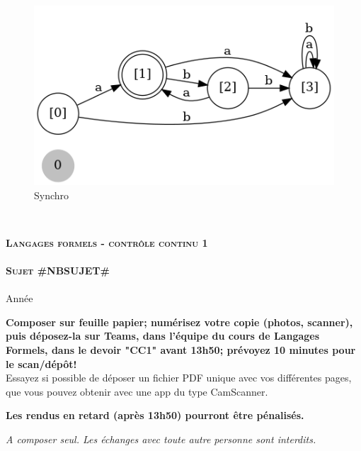 \documentclass[]{article}
\begin{document}
\begin{enumerate}
\begin{figure}[htbp]
            \includegraphics[width=15cm]{automateSynchro.png}
            \caption{Synchro}\label{fig:3.1}
        \end{figure}\\
    \end{enumerate}
    \setcounter{section}{0}
    \newpage
    \begin{center}
    {\Large \textbf{\textsc{Langages formels - contrôle continu 1}}}
        \\
        ~\\
        {\Huge \textbf{\textsc{Sujet #NBSUJET#}}}\\
        ~\\
        Année \the\year
    \end{center}

    \vskip 5mm
    \textbf{Composer sur feuille papier; numérisez votre copie (photos, scanner), puis déposez-la sur Teams, dans l'équipe du cours de Langages Formels, dans le devoir "CC1" avant 13h50; prévoyez 10 minutes pour le scan/dépôt!} \\

    Essayez si possible de déposer un fichier PDF unique avec vos différentes pages, que vous pouvez obtenir avec une app du type CamScanner.


    \textbf{Les rendus en retard (après 13h50) pourront être pénalisés.}


    \emph{A composer seul. Les échanges avec toute autre personne sont interdits.}\\
\end{document}
